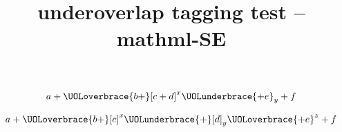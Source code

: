 \documentclass{article}
\title{underoverlap tagging test -- mathml-SE}
\begin{document}
\[ a + \UOLoverbrace{b +}[c + d]^x \UOLunderbrace{+ e}_y + f \]

\[ a + \UOLoverbrace{b +}[c]^x \UOLunderbrace{+}[d]_y \UOLoverbrace{+ e}^z + f \]
\end{document}
